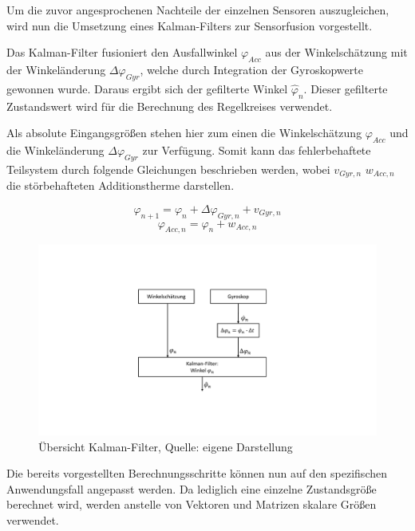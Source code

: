 Um die zuvor angesprochenen Nachteile der einzelnen Sensoren auszugleichen, wird nun die Umsetzung eines Kalman-Filters zur Sensorfusion vorgestellt.

Das Kalman-Filter fusioniert den Ausfallwinkel $\varphi_{Acc}$ aus der Winkelschätzung mit der Winkeländerung $\Delta \varphi_{Gyr}$, welche durch Integration der Gyroskopwerte gewonnen wurde. Daraus ergibt sich der gefilterte Winkel $\hat{\varphi}_n$. Dieser gefilterte Zustandswert wird für die Berechnung des Regelkreises verwendet.

Als absolute Eingangsgrößen stehen hier zum einen die Winkelschätzung $\varphi_{Acc}$ und die Winkeländerung $\Delta \varphi_{Gyr}$ zur Verfügung. Somit kann das fehlerbehaftete Teilsystem durch folgende Gleichungen beschrieben werden, wobei $v_{Gyr,n}$ $w_{Acc,n}$ die störbehafteten Additionstherme darstellen.

\begin{equation}
\varphi_{n+1} = \varphi_{n} + \Delta \varphi_{Gyr,n} + v_{Gyr,n}
\end{equation}
\begin{equation}
\varphi_{Acc,n} = \varphi_n + w_{Acc,n}
\end{equation}


\newpage
\begin{figure}[h!]
\centering
\includegraphics[width=\linewidth, trim={0 3.5cm 0 3.5cm},clip]{img/Kalman_overview}
\caption{Übersicht Kalman-Filter, Quelle: eigene Darstellung}
\end{figure}

Die bereits vorgestellten Berechnungsschritte können nun auf den spezifischen Anwendungsfall angepasst werden. Da lediglich eine einzelne Zustandsgröße berechnet wird, werden anstelle von Vektoren und Matrizen skalare Größen verwendet.


